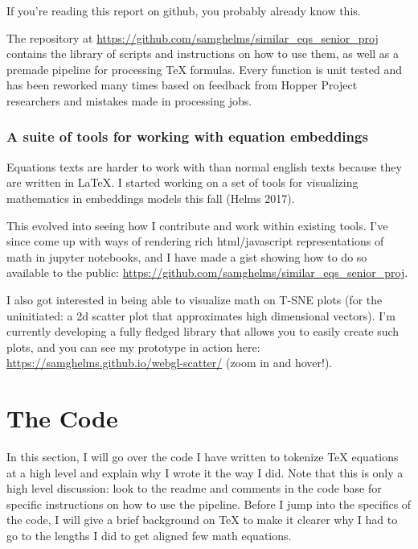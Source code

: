 \documentclass[]{article}
\begin{document}
If you're reading this report on github, you probably already know this.

The repository at
\url{https://github.com/samghelms/similar_eqs_senior_proj} contains the
library of scripts and instructions on how to use them, as well as a
premade pipeline for processing TeX formulas. Every function is unit
tested and has been reworked many times based on feedback from Hopper
Project researchers and mistakes made in processing jobs.

\hypertarget{a-suite-of-tools-for-working-with-equation-embeddings}{%
\subsubsection{A suite of tools for working with equation
embeddings}\label{a-suite-of-tools-for-working-with-equation-embeddings}}

Equations texts are harder to work with than normal english texts
because they are written in LaTeX. I started working on a set of tools
for visualizing mathematics in embeddings models this fall (Helms 2017).

This evolved into seeing how I contribute and work within existing
tools. I've since come up with ways of rendering rich html/javascript
representations of math in jupyter notebooks, and I have made a gist
showing how to do so available to the public:
\href{https://gist.github.com/samghelms/d1bd0a941c29044d6baa213ad96daa67}{https://github.com/samghelms/similar\_eqs\_senior\_proj}.

I also got interested in being able to visualize math on T-SNE plots
(for the uninitiated: a 2d scatter plot that approximates high
dimensional vectors). I'm currently developing a fully fledged library
that allows you to easily create such plots, and you can see my
prototype in action here:
\url{https://samghelms.github.io/webgl-scatter/} (zoom in and hover!).

\hypertarget{the-code}{%
\section{The Code}\label{the-code}}

In this section, I will go over the code I have written to tokenize TeX
equations at a high level and explain why I wrote it the way I did. Note
that this is only a high level discussion: look to the readme and
comments in the code base for specific instructions on how to use the
pipeline. Before I jump into the specifics of the code, I will give a
brief background on TeX to make it clearer why I had to go to the
lengths I did to get aligned few math equations.
\end{document}
